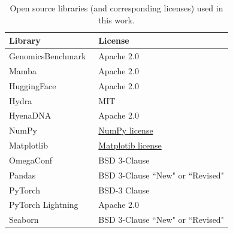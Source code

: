 \documentclass[pdflatex, sn-mathphys-num, lineno]{sn-jnl}%
\theoremstyle{thmstyleone}%
\theoremstyle{thmstyletwo}%
\theoremstyle{thmstylethree}%
\begin{document}
\begin{table}
    \caption{Open source libraries (and corresponding licenses) used in this work.}
    \label{tab:assets}
            \begin{tabular}{ll}
                \toprule
                Library                                                & License                                                                            \\ \midrule
                GenomicsBenchmark~\cite{grevsova2023genomic}           & Apache 2.0                                                                         \\
                Mamba~\cite{gu2023mamba}                               & Apache 2.0                                                                         \\
                HuggingFace~\cite{wolf2019huggingface}                 & Apache 2.0                                                                         \\
                Hydra~\cite{Yadan2019Hydra}                            & MIT                                                                                \\
                HyenaDNA~\cite{nguyen2024hyenadna}                     & Apache 2.0                                                                         \\
                NumPy~\cite{harris2020array}                           & \href{https://numpy.org/doc/stable/license.html}{NumPy license}                    \\
                Matplotlib~\cite{Hunter2007}                           & \href{https://matplotlib.org/stable/users/project/license.html}{Matplotib license} \\
                OmegaConf                                              & BSD 3-Clause                                                                       \\
                Pandas \cite{reback2020pandas}                         & BSD 3-Clause ``New" or ``Revised"                                                  \\
                PyTorch~\cite{paszke2019pytorch}                       & BSD-3 Clause                                                                       \\
                PyTorch Lightning~\cite{Falcon_PyTorch_Lightning_2019} & Apache 2.0                                                                         \\
                Seaborn~\cite{Waskom2021}                              & BSD 3-Clause ``New" or ``Revised"                                                  \\ \bottomrule
            \end{tabular}
\end{table}
\end{document}
